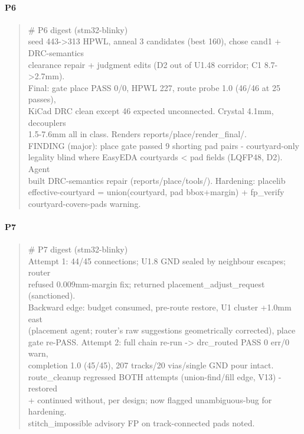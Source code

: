 \documentclass[11pt,a4paper]{article}
\begin{document}
\paragraph*{P6}
\begin{quote}\small\ttfamily\raggedright
\# P6 digest (stm32-blinky)\\
seed 443-\textgreater{}313 HPWL, anneal 3 candidates (best 160), chose cand1 + DRC-semantics\\
clearance repair + judgment edits (D2 out of U1.48 corridor; C1 8.7-\textgreater{}2.7mm).\\
Final: gate place PASS 0/0, HPWL 227, route probe 1.0 (46/46 at 25 passes),\\
KiCad DRC clean except 46 expected unconnected. Crystal 4.1mm, decouplers\\
1.5-7.6mm all in class. Renders reports/place/render\_final/.\\
FINDING (major): place gate passed 9 shorting pad pairs - courtyard-only\\
legality blind where EasyEDA courtyards \textless{} pad fields (LQFP48, D2). Agent\\
built DRC-semantics repair (reports/place/tools/). Hardening: placelib\\
effective-courtyard = union(courtyard, pad bbox+margin) + fp\_verify\\
courtyard-covers-pads warning.
\end{quote}
\paragraph*{P7}
\begin{quote}\small\ttfamily\raggedright
\# P7 digest (stm32-blinky)\\
Attempt 1: 44/45 connections; U1.8 GND sealed by neighbour escapes; router\\
refused 0.009mm-margin fix; returned placement\_adjust\_request (sanctioned).\\
Backward edge: budget consumed, pre-route restore, U1 cluster +1.0mm east\\
(placement agent; router's raw suggestions geometrically corrected), place\\
gate re-PASS. Attempt 2: full chain re-run -\textgreater{} drc\_routed PASS 0 err/0 warn,\\
completion 1.0 (45/45), 207 tracks/20 vias/single GND pour intact.\\
route\_cleanup regressed BOTH attempts (union-find/fill edge, V13) - restored\\
+ continued without, per design; now flagged unambiguous-bug for hardening.\\
stitch\_impossible advisory FP on track-connected pads noted.
\end{quote}
\end{document}
